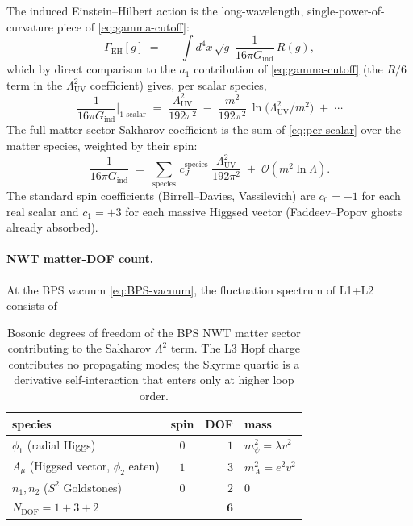 \documentclass[11pt]{article}
\begin{document}
The induced Einstein--Hilbert action is the long-wavelength,
single-power-of-curvature piece of \eqref{eq:gamma-cutoff}:
\begin{equation}
  \Gamma_{\mathrm{EH}}[g]
   \;=\;
   -\,\int d^4 x\,\sqrt{g}\;
       \frac{1}{16\pi G_{\mathrm{ind}}}\,R(g),
  \label{eq:gamma-EH}
\end{equation}
which by direct comparison to the $a_1$ contribution of
\eqref{eq:gamma-cutoff} (the $R/6$ term in the
$\Lambda_{\mathrm{UV}}^2$ coefficient) gives, per scalar species,
\begin{equation}
  \frac{1}{16\pi G_{\mathrm{ind}}}\bigg|_{\text{1 scalar}}
   \;=\;
   \frac{\Lambda_{\mathrm{UV}}^2}{192\pi^2}
   \;-\;\frac{m^2}{192\pi^2}\,\ln\!\bigl(\Lambda_{\mathrm{UV}}^2/m^2\bigr)
   \;+\;\cdots
  \label{eq:per-scalar}
\end{equation}
The full matter-sector Sakharov coefficient is the sum of
\eqref{eq:per-scalar} over the matter species, weighted by their
spin:
\begin{equation}
  \frac{1}{16\pi G_{\mathrm{ind}}}
   \;=\;
   \sum_{\text{species}}\,c_J^{\text{species}}\;
   \frac{\Lambda_{\mathrm{UV}}^2}{192\pi^2}
   \;+\;\mathcal{O}(m^2 \ln \Lambda).
  \label{eq:total-sakharov}
\end{equation}
The standard spin coefficients (Birrell--Davies, Vassilevich) are
$c_0 = +1$ for each real scalar and $c_1 = +3$ for each massive
Higgsed vector (Faddeev--Popov ghosts already absorbed).

\paragraph{NWT matter-DOF count.}  At the BPS vacuum
\eqref{eq:BPS-vacuum}, the fluctuation spectrum of L1+L2 consists of
\begin{table}[H]
\centering
\begin{tabular}{lcrl}
\toprule
\textbf{species} & \textbf{spin} & \textbf{DOF} & \textbf{mass} \\
\midrule
$\phi_1$ (radial Higgs)                        & $0$ & $1$ & $m_\psi^2 = \lambda v^2$ \\
$A_\mu$ (Higgsed vector, $\phi_2$ eaten)       & $1$ & $3$ & $m_A^2 = e^2 v^2$ \\
$n_1, n_2$ ($S^2$ Goldstones)                  & $0$ & $2$ & $0$ \\
\midrule
$N_{\mathrm{DOF}} = 1 + 3 + 2$                 &     & $\mathbf{6}$ & \\
\bottomrule
\end{tabular}
\caption{Bosonic degrees of freedom of the BPS NWT matter sector
contributing to the Sakharov $\Lambda^2$ term.  The L3 Hopf charge
contributes no propagating modes; the Skyrme quartic is a derivative
self-interaction that enters only at higher loop order.}
\label{tab:bps-dof}
\end{table}
\end{document}
